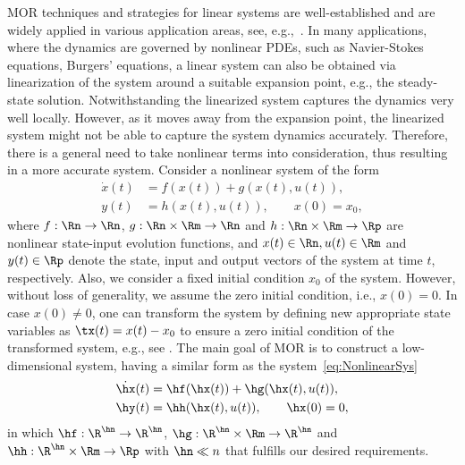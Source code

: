 MOR techniques and strategies for linear systems are well-established and  are widely applied in various application areas, see, e.g.,~\cite{morAnt05,morBenMS05,morSchVR08}. In many applications, where the dynamics are governed by nonlinear PDEs, such as Navier-Stokes equations, Burgers' equations, a linear system can also be obtained via  linearization of the system around a suitable expansion point, e.g., the steady-state solution.   Notwithstanding the linearized system captures the dynamics very well locally. However, as it moves away from the expansion point, the linearized system might not be able to capture the system dynamics accurately. Therefore, there is a general need to take nonlinear terms into consideration, thus resulting in  a more accurate system. Consider a nonlinear system of the form
\begin{equation}\label{eq:NonlinearSys}
\begin{aligned}
 \dot{x}(t) &=  f(x(t)) + g(x(t),u(t)), \\
 y(t) &= h(x(t),u(t)), \qquad x(0) = x_0,
\end{aligned}
 \end{equation}
where $f:\Rn \rightarrow \Rn$, $g:\Rn\times\Rm \rightarrow \Rn$ and $h:\Rn\times \Rm \rightarrow \Rp$ are nonlinear state-input evolution functions, and $x(t)\in\Rn, u(t)\in\Rm$ and $y(t)\in \Rp$ denote the state, input and output vectors of the system at time $t$, respectively.  Also, we consider a fixed initial condition $x_0$ of the system. However,   without loss of generality,  we assume  the zero initial condition, i.e., $x(0) =0$. In  case $x(0) \neq 0$, one can transform the system by defining new appropriate state variables as $\tx(t) = x(t) - x_0$  to ensure  a zero initial condition of the transformed system, e.g., see \cite{morBauBF14}. The main goal of MOR is to construct a low-dimensional system, having  a similar form as the system~\eqref{eq:NonlinearSys}
\begin{equation}\label{eq:NonlinearSys_Red}
\begin{aligned}
 \dot{\hx}(t) &=  \hf(\hx(t)) + \hg(\hx(t),u(t)), \\
 \hy(t) &= \hh(\hx(t),u(t)), \qquad \hx(0) = 0,
\end{aligned}
 \end{equation}
in which $\hf:\R^{\hn} \rightarrow \R^{\hn}$, $\hg:\R^{\hn}\times\Rm \rightarrow \R^{\hn}$ and $\hh:\R^{\hn}\times \Rm \rightarrow \Rp$ with $\hn \ll n$ that fulfills our desired requirements.

